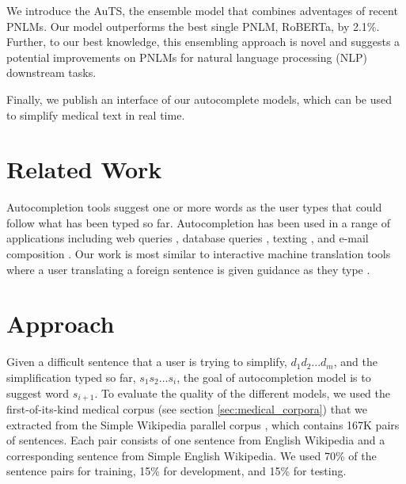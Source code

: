 \documentclass[11pt]{article}
\begin{document}
 We introduce the AuTS, the ensemble model that combines adventages of recent PNLMs. Our model outperforms the best single PNLM, RoBERTa, by 2.1\%. Further, to our best knowledge, this ensembling approach is novel and suggests a potential improvements on PNLMs for natural language processing (NLP) downstream tasks.

 Finally, we publish an interface of our autocomplete models, which can be used to simplify medical text in real time.

\section{Related Work}

Autocompletion tools suggest one or more words as the user types that could follow what has been typed so far. Autocompletion has been used in a range of applications including web queries \cite{cai2016survey}, database queries \cite{khoussainova2010snipsuggest}, texting \cite{dunlop2000predictive}, and e-mail composition \cite{dai2019gmail}. Our work is most similar to interactive machine translation tools where a user translating a foreign sentence is given guidance as they type \cite{green-etal-2014-human}.

\section{Approach}

Given a difficult sentence that a user is trying to simplify, $d_1 d_2 ... d_m$, and the simplification typed so far, $s_1 s_2 ... s_i$, the goal of autocompletion model is to suggest word $s_{i+1}$. To evaluate the quality of the different models, we used the first-of-its-kind medical corpus (see section \ref{sec:medical_corpora}) that we extracted from the Simple Wikipedia parallel corpus \cite{kauchak2013improving}, which contains 167K pairs of sentences. Each pair consists of one sentence from English Wikipedia and a corresponding sentence from Simple English Wikipedia. We used 70\% of the sentence pairs for training, 15\% for development, and 15\% for testing. 
\end{document}

